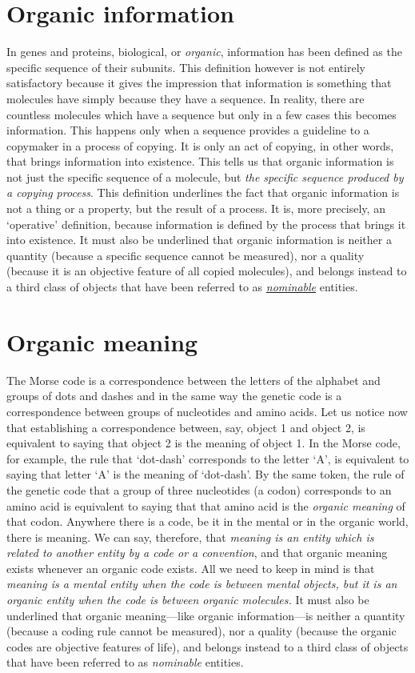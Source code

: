 \documentclass[12pt]{article}
\begin{document}
\section{Organic information}
In genes and proteins, biological, or \textit{organic}, information has been defined as the specific sequence of their subunits. This definition however is not entirely satisfactory because it gives the impression that information is something that molecules have simply because they have a sequence. In reality, there are countless molecules which have a sequence but only in a few cases this becomes information. This happens only when a sequence provides a guideline to a copymaker in a process of copying. It is only an act of copying, in other words, that brings information into existence. This tells us that organic information is not just the specific sequence of a molecule, but \textit{the specific sequence produced by a copying process}. This definition underlines the fact that organic information is not a thing or a property, but the result of a process. It is, more precisely, an `operative' definition, because information is defined by the process that brings it into existence. It must also be underlined that organic information is neither a quantity (because a specific sequence cannot be measured), nor a quality (because it is an objective feature of all copied molecules), and belongs instead to a third class of objects that have been referred to as \hyperlink{nominable_entity}{\textit{nominable}} entities.


\section{Organic meaning}
The Morse code is a correspondence between the letters of the alphabet and groups of dots and dashes and in the same way the genetic code is a correspondence between groups of nucleotides and amino acids. Let us notice now that establishing a correspondence between, say, object 1 and object 2, is equivalent to saying that object 2 is the meaning of object 1. In the Morse code, for example, the rule that `dot-dash' corresponds to the letter `A', is equivalent to saying that letter `A' is the meaning of `dot-dash'. By the same token, the rule of the genetic code that a group of three nucleotides (a codon) corresponds to an amino acid is equivalent to saying that that amino acid is the \textit{organic meaning} of that codon. Anywhere there is a code, be it in the mental or in the organic world, there is meaning. We can say, therefore, that \textit{meaning is an entity which is related to another entity by a code or a convention}, and that organic meaning exists whenever an organic code exists. All we need to keep in mind is that \textit{meaning is a mental entity when the code is between mental objects, but it is an organic entity when the code is between organic molecules.} It must also be underlined that organic meaning---like organic information---is neither a quantity (because a coding rule cannot be measured), nor a quality (because the organic codes are objective features of life), and belongs instead to a third class of objects that have been referred to as \textit{nominable} entities.
\end{document}
